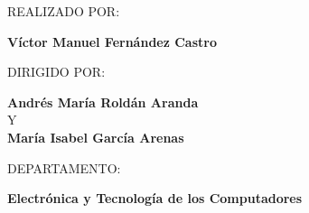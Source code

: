 \begin{center}
REALIZADO POR:
\par\end{center}

\begin{center}
\textbf{Víctor Manuel Fernández Castro}
\par\end{center}

\begin{center}
DIRIGIDO POR:
\par\end{center}

\begin{center}
\textbf{Andrés María Roldán Aranda} \\
Y \\
\textbf{María Isabel García Arenas}
\par\end{center}

\begin{center}
DEPARTAMENTO:
\par\end{center}

\begin{center}
\textbf{Electrónica y Tecnología de los Computadores}
\par\end{center}

\begin{center}
\vfill 
\par\end{center}



\vspace*{1.5cm}

\newpage
\thispagestyle{empty}

~

